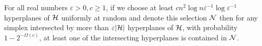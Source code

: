 \begin{theorem}\label{thm:enet}
	For all real numbers $\varepsilon > 0, c \ge 1$,
	if we choose at least \(c n^2 \log n \varepsilon^{-1} \log
	\varepsilon^{-1} \) hyperplanes of \(\mathcal{H}\) uniformly at
random and denote this selection \(\mathcal{N}\) then for
any simplex intersected by more than \(\varepsilon |{\mathcal{H}}|\) hyperplanes of
\(\mathcal{H}\), with probability $1 - 2^{-\Omega(c)}$, at least one of the intersecting hyperplanes
is contained in \(\mathcal{N}\).
\end{theorem}
